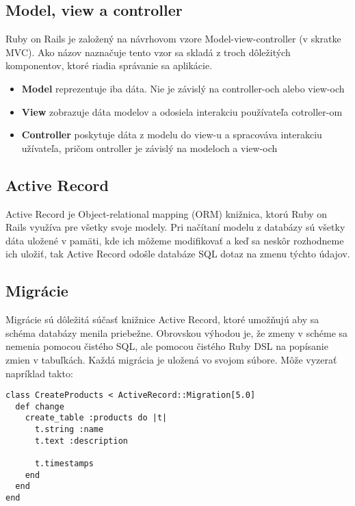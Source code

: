 \subsection{Model, view a controller}

Ruby on Rails je založený na návrhovom vzore Model-view-controller (v skratke MVC). Ako názov naznačuje tento vzor sa skladá z troch dôležitých komponentov, ktoré riadia správanie sa aplikácie.

\begin{itemize}
    \item \textbf{Model} reprezentuje iba dáta. Nie je závislý na controller-och alebo view-och
    \item \textbf{View} zobrazuje dáta modelov a odosiela interakciu používateľa cotroller-om
    \item \textbf{Controller} poskytuje dáta z modelu do view-u a spracováva interakciu užívateľa, pričom ontroller je závislý na modeloch a view-och
\end{itemize}

\subsection{Active Record}

Active Record je Object-relational mapping (ORM) knižnica, ktorú Ruby on Rails využíva pre všetky svoje modely. Pri načítaní modelu z databázy sú všetky dáta uložené v pamäti, kde ich môžeme modifikovať a keď sa neskôr rozhodneme ich uložiť, tak Active Record odošle databáze SQL dotaz na zmenu týchto údajov.

\subsection{Migrácie}

Migrácie sú dôležitá súčasť knižnice Active Record, ktoré umožňujú aby sa schéma databázy menila priebežne. Obrovskou výhodou je, že zmeny v schéme sa nemenia pomocou čistého SQL, ale pomocou čistého Ruby DSL na popísanie zmien v tabuľkách.
Každá migrácia je uložená vo svojom súbore. Môže vyzerať napríklad takto:

\begin{verbatim}
class CreateProducts < ActiveRecord::Migration[5.0]
  def change
    create_table :products do |t|
      t.string :name
      t.text :description
 
      t.timestamps
    end
  end
end
\end{verbatim}

